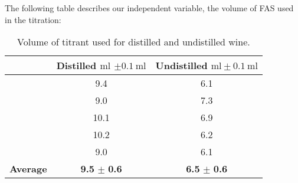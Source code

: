 The following table describes our independent variable, the volume of FAS used in the titration:
\begin{table} [h]
\begin{tabular}{l c|c}
&	Distilled $\si{\milli\litre}$ $\pm \SI{0.1}{\milli\litre}$ & Undistilled $\si{\milli\litre} \pm \SI{0.1}{\milli\litre}$ \\ \hline
&	9.4		&	6.1\\
&	9.0		&	7.3\\
&	10.1	&	6.9\\
&	10.2	&	6.2\\
&	9.0		&	6.1\\ \hline
\textbf{Average} & \textbf{9.5} $\pm$ \textbf{0.6} & \textbf{6.5} $\pm$ \textbf{0.6}
	
\end{tabular}
\caption{Volume of titrant used for distilled and undistilled wine.}
\end{table}